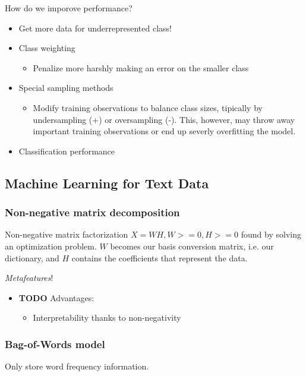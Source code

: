 \documentclass[11pt]{article}
\begin{document}
\begin{itemize}
How do we imporove performance?
\begin{itemize}
\item Get more data for underrepresented class!
\item Class weighting
\begin{itemize}
\item Penalize more harshly making an error on the smaller class
\end{itemize}
\item Special sampling methods
\begin{itemize}
\item Modify training observations to balance class sizes, tipically by undersampling (+) or oversampling (-). This, however, may throw away important training observations or end up severly overfitting the model.
\end{itemize}
\end{itemize}
\begin{itemize}
\item Classification performance
\label{sec-5-2-1-1}
\end{itemize}
\subsection{Machine Learning for Text Data}
\label{sec-5-3}
\subsubsection*{Non-negative matrix decomposition}
\label{sec-5-3-1}
Non-negative matrix factorization $X=WH,W>=0,H>=0$ found by solving an optimization problem. $W$ becomes our basis conversion matrix, i.e. our dictionary, and $H$ contains the coefficients that represent the data.

\emph{Metafeatures}!

\begin{itemize}
\item {\bfseries\sffamily TODO} Advantages:
\label{sec-5-3-1-1}
\begin{itemize}
\item Interpretability thanks to non-negativity
\end{itemize}
\end{itemize}

\subsubsection*{Bag-of-Words model}
\label{sec-5-3-2}
Only store word frequency information.


\end{itemize}
\end{document}
